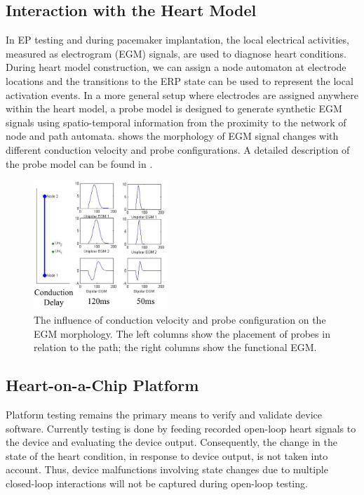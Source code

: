 \subsection{Interaction with the Heart Model}
In EP testing and during pacemaker implantation, the local electrical activities, measured as electrogram (EGM) signals, are used to diagnose heart conditions. During heart model construction, we can assign a node automaton at electrode locations and the transitions to the ERP state can be used to represent the local activation events. In a more general setup where electrodes are assigned anywhere within the heart model, a probe model is designed to generate synthetic EGM signals using spatio-temporal information from the proximity to the network of node and path automata.  shows the morphology of EGM signal changes with different conduction velocity and probe configurations. A detailed description of the probe model can be found in \cite{vhm_embc11}.

\begin{figure}[!t]
\center
		\includegraphics[width=0.45\textwidth]{figs/fig7.png}
\caption{The influence of conduction velocity and probe configuration on the EGM morphology. The left columns show the placement of probes in relation to the path; the right columns show the functional EGM.}
\label{fig:egm_s}
\end{figure}
\subsection{Heart-on-a-Chip Platform}
Platform testing remains the primary means to verify and validate device software. Currently testing is done by feeding recorded open-loop heart signals to the device and evaluating the device output. Consequently, the change in the state of the heart condition, in response to device output, is not taken into account. Thus, device malfunctions involving state changes due to multiple closed-loop interactions will not be captured during open-loop testing. 

